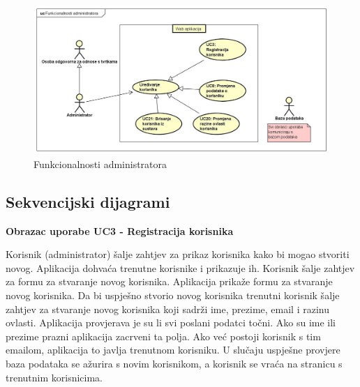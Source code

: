 					\begin{figure}[H]
						\includegraphics[scale=0.3]{slike/UC dijagrami/UseCase administrator}
						\centering
						\caption{Funkcionalnosti administratora}
						\label{fig:administrator}
					\end{figure}

				\eject

			\subsection{Sekvencijski dijagrami}



				\textbf{Obrazac uporabe UC3 - Registracija korisnika}\vspace{0.1cm}

				{Korisnik (administrator) šalje zahtjev za prikaz korisnika kako bi mogao stvoriti novog. Aplikacija dohvaća trenutne korisnike i prikazuje ih. Korisnik šalje zahtjev za formu za stvaranje novog korisnika. Aplikacija prikaže formu za stvaranje novog korisnika. Da bi uspješno stvorio novog korisnika trenutni korisnik šalje zahtjev za stvaranje novog korisnika koji sadrži ime, prezime, email i razinu ovlasti. Aplikacija provjerava je su li svi poslani podatci točni. Ako su ime ili prezime prazni aplikacija zacrveni ta polja. Ako već postoji korisnik s tim emailom, aplikacija to javlja trenutnom korisniku. U slučaju uspješne provjere baza podataka se ažurira s novim korisnikom, a korisnik se vraća na stranicu s trenutnim korisnicima.}
                
